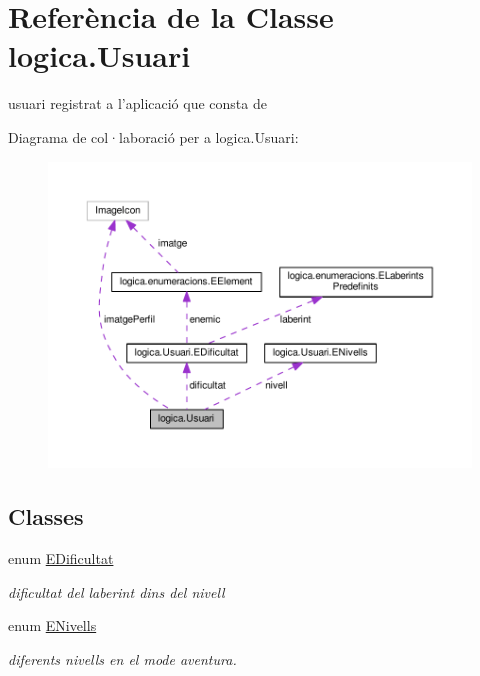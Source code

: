 \hypertarget{classlogica_1_1_usuari}{\section{Referència de la Classe logica.\+Usuari}
\label{classlogica_1_1_usuari}
}


usuari registrat a l'aplicació que consta de  




Diagrama de col·laboració per a logica.\+Usuari\+:
\nopagebreak
\begin{figure}[H]
\begin{center}
\leavevmode
\includegraphics[width=350pt]{classlogica_1_1_usuari__coll__graph}
\end{center}
\end{figure}
\subsection*{Classes}
\begin{DoxyCompactItemize}
\item 
enum \hyperlink{enumlogica_1_1_usuari_1_1_e_dificultat}{E\+Dificultat}
\begin{DoxyCompactList}\small\item\em dificultat del laberint dins del nivell \end{DoxyCompactList}\item 
enum \hyperlink{enumlogica_1_1_usuari_1_1_e_nivells}{E\+Nivells}
\begin{DoxyCompactList}\small\item\em diferents nivells en el mode aventura. \end{DoxyCompactList}\end{DoxyCompactItemize}
